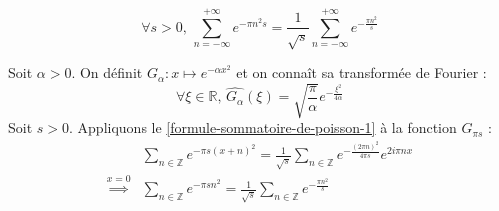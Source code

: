 	\begin{application}
		\[ \forall s > 0, \, \sum_{n=-\infty}^{+\infty} e^{-\pi n^2 s} = \frac{1}{\sqrt{s}} \sum_{n=-\infty}^{+\infty} e^{-\frac{\pi n^2}{s}} \]
	\end{application}

	\begin{demonstration}
		Soit $\alpha > 0$. On définit $G_\alpha : x \mapsto e^{-\alpha x^2}$ et on connaît sa transformée de Fourier :
		\[ \forall \xi \in \mathbb{R}, \, \widehat{G_\alpha}(\xi) = \sqrt{\frac{\pi}{\alpha}} e^{-\frac{\xi^2}{4 \alpha}} \]
		Soit $s > 0$. Appliquons le \cref{formule-sommatoire-de-poisson-1} à la fonction $G_{\pi s}$ :
		\begin{align*}
			& \sum_{n \in \mathbb{Z}} e^{-\pi s (x + n)^2} = \frac{1}{\sqrt{s}} \sum_{n \in \mathbb{Z}} e^{-\frac{(2 \pi n)^2}{4 \pi s}} e^{2 i \pi n x} \\
			\overset{x = 0}{\implies} & \sum_{n \in \mathbb{Z}} e^{-\pi s n^2} = \frac{1}{\sqrt{s}} \sum_{n \in \mathbb{Z}} e^{-\frac{\pi n^2}{s}}
		\end{align*}
	\end{demonstration}
